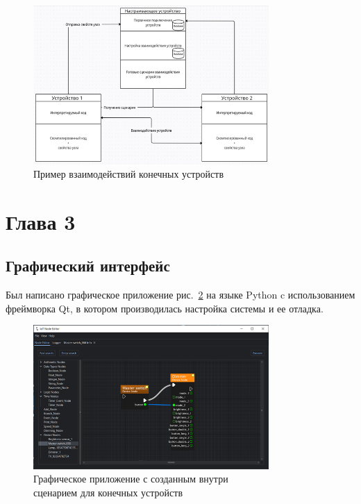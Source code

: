 \documentclass[a4paper,12pt]{article}
\begin{document}
\begin{figure}[h]
    \centering
    \includegraphics[width=0.8\textwidth]{images/Fig09.png}
    \caption{Пример взаимодействий конечных устройств}
    \label{fig:Connect_end_device_example}
\end{figure}


\newpage

\section{Глава 3}

\subsection{Графический интерфейс}
Был написано графическое приложение рис.~\ref{fig:GUI_base} на языке Python c использованием фреймворка Qt, в котором производилась настройка системы и ее отладка.

\begin{figure}[H]
    \centering
    \includegraphics[width=0.8\textwidth]{images/Fig11.png}
    \captionsetup{justification=centering}
    \caption{Графическое приложение с созданным внутри\\сценарием для конечных устройств}
    \label{fig:GUI_base}
\end{figure}
\end{document}

